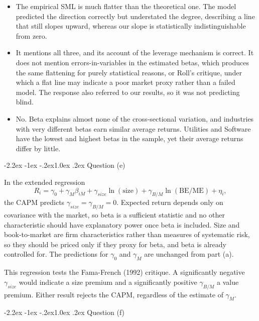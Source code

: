 \documentclass[11pt]{article}
\makeatletter
\renewcommand\subsection{\@startsection{subsection}{2}{0pt}%
  {-2.2ex \@plus -1ex \@minus -.2ex}{1.0ex \@plus .2ex}%
  {\normalfont\bfseries\normalsize\color{psink}}}
\newenvironment{tight}
  {\begin{itemize}\setlength{\itemsep}{3pt}\setlength{\parskip}{0pt}%
   \setlength{\topsep}{3pt}\setlength{\leftmargini}{1.4em}}
  {\end{itemize}}
\makeatother
\begin{document}
\begin{tight}
\item[(i)] The empirical SML is much flatter than the theoretical one. The
model predicted the direction correctly but understated the degree, describing
a line that still slopes upward, whereas our slope is statistically
indistinguishable from zero.
\item[(ii)] It mentions all three, and its account of the leverage mechanism
is correct. It does not mention errors-in-variables in the estimated betas,
which produces the same flattening for purely statistical reasons, or Roll's
critique, under which a flat line may indicate a poor market proxy rather than
a failed model. The response also referred to our results, so it was not
predicting blind.
\item[(iii)] No. Beta explains almost none of the cross-sectional variation,
and industries with very different betas earn similar average returns.
Utilities and Software have the lowest and highest betas in the sample, yet
their average returns differ by little.
\end{tight}

\subsection{Question (e)}

In the extended regression
\[
R_i = \gamma_0 + \gamma_M \beta_{iM} + \gamma_{size}\ln(\text{size})
+ \gamma_{B/M}\ln(\text{BE/ME}) + \eta_i ,
\]
the CAPM predicts $\gamma_{size} = \gamma_{B/M} = 0$. Expected return depends
only on covariance with the market, so beta is a sufficient statistic and no
other characteristic should have explanatory power once beta is included. Size
and book-to-market are firm characteristics rather than measures of systematic
risk, so they should be priced only if they proxy for beta, and beta is already
controlled for. The predictions for $\gamma_0$ and $\gamma_M$ are unchanged
from part (a).

This regression tests the Fama-French (1992) critique. A significantly negative
$\gamma_{size}$ would indicate a size premium and a significantly positive
$\gamma_{B/M}$ a value premium. Either result rejects the CAPM, regardless of
the estimate of $\gamma_M$.

\subsection{Question (f)}
\end{document}
